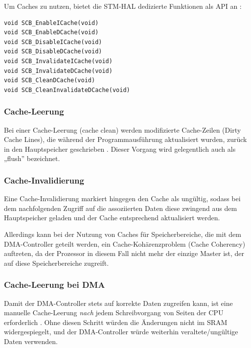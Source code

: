 Um Caches zu nutzen, bietet die STM-\ac{HAL} dedizierte Funktionen als API an
\cite[S. 4]{an4839}:

\begin{code}
\begin{verbatim}
void SCB_EnableICache(void)
void SCB_EnableDCache(void)
void SCB_DisableICache(void)
void SCB_DisableDCache(void)
void SCB_InvalidateICache(void)
void SCB_InvalidateDCache(void)
void SCB_CleanDCache(void)
void SCB_CleanInvalidateDCache(void)
\end{verbatim}
\end{code}

\subsubsection{Cache-Leerung}

Bei einer Cache-Leerung (cache clean) werden modifizierte Cache-Zeilen (Dirty
Cache Lines), die während der Programmausführung aktualisiert wurden, zurück in
den Hauptspeicher geschrieben \cite[S. 4]{an4839}. Dieser Vorgang wird
gelegentlich auch als „flush” bezeichnet.

\subsubsection{Cache-Invalidierung}

Eine Cache-Invalidierung markiert hingegen den Cache als ungültig, sodass bei
dem nachfolgenden Zugriff auf die assoziierten Daten diese zwingend aus dem
Hauptspeicher geladen und der Cache entsprechend aktualisiert werden.

Allerdings kann bei der Nutzung von Caches für Speicherbereiche, die mit dem
DMA-Controller geteilt werden, ein Cache-Kohärenzproblem (Cache Coherency)
auftreten, da der Prozessor in diesem Fall nicht mehr der einzige Master ist,
der auf diese Speicherbereiche zugreift.

\subsubsection{Cache-Leerung bei DMA} \label{sec:cache_clean}

Damit der DMA-Controller stets auf korrekte Daten zugreifen kann, ist eine
manuelle Cache-Leerung \textit{nach} jedem Schreibvorgang von Seiten der CPU
erforderlich \cite[S. 6]{an4839}. Ohne diesen Schritt würden die Änderungen
nicht im SRAM widergespiegelt, und der DMA-Controller würde weiterhin
veraltete/ungültige Daten verwenden.

